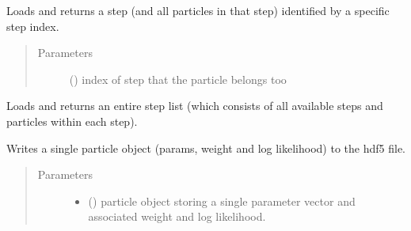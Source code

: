 \documentclass[letterpaper,10pt,english]{sphinxmanual}
\begin{document}
\begin{fulllineitems}
\begin{fulllineitems}
\label{\detokenize{source_code:smcpy.hdf5.hdf5_storage.HDF5Storage.read_step}}
Loads and returns a step (and all particles in that step) identified by         a specific step index.
\begin{quote}\begin{description}
\item[{Parameters}] \leavevmode
{} () \textendash{} index of step that the particle belongs too

\end{description}\end{quote}

\end{fulllineitems}


\begin{fulllineitems}
\label{\detokenize{source_code:smcpy.hdf5.hdf5_storage.HDF5Storage.read_step_list}}
Loads and returns an entire step list (which consists of all
available steps and particles within each step).

\end{fulllineitems}


\begin{fulllineitems}
\label{\detokenize{source_code:smcpy.hdf5.hdf5_storage.HDF5Storage.write_particle}}
Writes a single particle object (params, weight and log likelihood)
to the hdf5 file.
\begin{quote}\begin{description}
\item[{Parameters}] \leavevmode\begin{itemize}
\item {} 
 () \textendash{} particle object storing a single parameter vector and
associated weight and log likelihood.


\end{itemize}
\end{description}
\end{quote}
\end{fulllineitems}
\end{fulllineitems}
\end{document}
